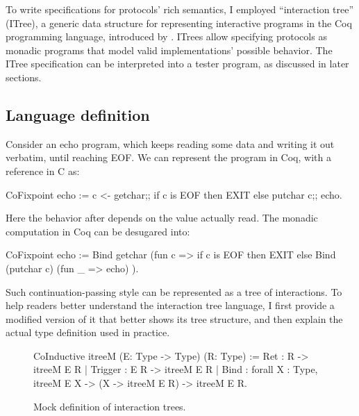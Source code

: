To write specifications for protocols' rich semantics, I employed ``interaction
tree'' (ITree), a generic data structure for representing interactive programs
in the Coq programming language, introduced by \citet{itree}.  ITrees allow
specifying protocols as monadic programs that model valid implementations'
possible behavior.  The ITree specification can be interpreted into a tester
program, as discussed in later sections.

\subsection{Language definition}
\label{sec:itree-lang}
Consider an echo program, which keeps reading some data and writing it out
verbatim, until reaching EOF.  We can represent the program in Coq, with a
reference in C as:
\begin{multicols}{2}
\begin{coq}
  CoFixpoint echo :=
    c <- getchar;;
    if c is EOF
    then EXIT
    else
      putchar c;;
      echo.
\end{coq}
\columnbreak
\begin{cpp}
  void echo() {
    const char c = getchar();
    if (c == EOF)
      return;
    else {
      putchar(c);
      echo();
    }
\end{cpp}
\end{multicols}
Here the behavior after  depends on the value actually read.  The
monadic computation in Coq can be desugared into:
\begin{coq}
  CoFixpoint echo :=
    Bind getchar
         (fun c => if c is EOF
                 then EXIT
                 else Bind (putchar c)
                           (fun _ => echo)
         ).
\end{coq}
Such continuation-passing style can be represented as a tree of interactions.
To help readers better understand the interaction tree language, I first provide
a modified version of it that better shows its tree structure, and then explain
the actual type definition used in practice.

\begin{figure}
\begin{coq}
  CoInductive itreeM (E: Type -> Type) (R: Type) :=
    Ret     : R   -> itreeM E R
  | Trigger : E R -> itreeM E R
  | Bind    : forall {X : Type}, itreeM E X -> (X -> itreeM E R) -> itreeM E R.
\end{coq}
\caption{Mock definition of interaction trees.}
\label{fig:mock-itree}
\end{figure}

